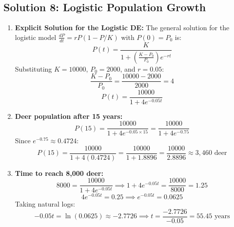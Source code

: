 \documentclass[11pt,letterpaper]{article}
\begin{document}
\subsection*{Solution 8: Logistic Population Growth}
\begin{enumerate}[label=(\alph*)]
    \item \textbf{Explicit Solution for the Logistic DE:}
    The general solution for the logistic model $\frac{dP}{dt} = r P(1 - P/K)$ with $P(0) = P_0$ is:
    \[ P(t) = \frac{K}{1 + \left( \frac{K - P_0}{P_0} \right) e^{-rt}} \]
    Substituting $K = 10000$, $P_0 = 2000$, and $r = 0.05$:
    \[ \frac{K - P_0}{P_0} = \frac{10000 - 2000}{2000} = 4 \]
    \[ P(t) = \frac{10000}{1 + 4 e^{-0.05t}} \]

    \item \textbf{Deer population after 15 years:}
    \[ P(15) = \frac{10000}{1 + 4 e^{-0.05 \times 15}} = \frac{10000}{1 + 4 e^{-0.75}} \]
    Since $e^{-0.75} \approx 0.4724$:
    \[ P(15) = \frac{10000}{1 + 4(0.4724)} = \frac{10000}{1 + 1.8896} = \frac{10000}{2.8896} \approx 3,460 \text{ deer} \]

    \item \textbf{Time to reach 8,000 deer:}
    \[ 8000 = \frac{10000}{1 + 4 e^{-0.05t}} \implies 1 + 4 e^{-0.05t} = \frac{10000}{8000} = 1.25 \]
    \[ 4 e^{-0.05t} = 0.25 \implies e^{-0.05t} = 0.0625 \]
    Taking natural logs:
    \[ -0.05t = \ln(0.0625) \approx -2.7726 \implies t = \frac{-2.7726}{-0.05} = 55.45 \text{ years} \]
\end{enumerate}
\end{document}

